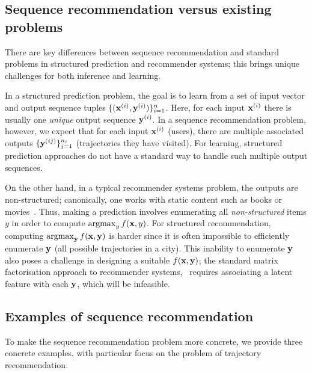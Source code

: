 %
\subsection{Sequence recommendation versus existing problems}

There are key differences between sequence recommendation and %
standard problems in structured prediction and recommender systems;
this brings unique challenges for both inference and learning.

In a structured prediction problem, the goal is to learn from a set of
input vector and output sequence tuples %
$\{ (\mathbf{x}^{({i})}, \mathbf{y}^{({i})}) \}_{i = 1}^n$. Here,
for each input $\mathbf{x}^{({i})}$ there is usually one \emph{unique} output sequence $\mathbf{y}^{({i})}$.
In a sequence recommendation problem, however, we expect that %
for each input $\mathbf{x}^{({i})}$ (\eg users),
there %
are multiple associated outputs %
$\{ \mathbf{y}^{({ij})} \}_{j=1}^{n_i}$ (\eg trajectories they have visited).
For learning, structured prediction approaches do not have a standard way to handle such multiple output sequences.

On the other hand, in a typical recommender systems problem, the outputs are non-structured; canonically, one works with {static} content such as books or movies~\citep{Goldberg:1992,Sarwar:2001,Netflix}.
Thus, making a prediction involves enumerating all {\em non-structured} items $y$ in order to compute $\operatorname*{argmax}_y f(\mathbf{x},y)$.
For structured recommendation, computing $\operatorname*{argmax}_{\mathbf{y}} f(\mathbf{x},\mathbf{y})$ is harder since it is often impossible to efficiently enumerate $\mathbf{y}$ (\eg all possible trajectories in a city).
This inability to enumerate $\mathbf{y}$ also poses a challenge in designing
a suitable $f(\mathbf{x},\mathbf{y})$;
the standard matrix factorisation approach to recommender systems,~\citep{Koren:2009}
requires associating a latent feature with each $\mathbf{y}$, which will be infeasible.


%
\subsection{Examples of sequence recommendation}
\label{sec:trajrec}

To make the sequence recommendation problem more concrete,
we provide three concrete examples,
with particular focus on the problem of trajectory recommendation.



